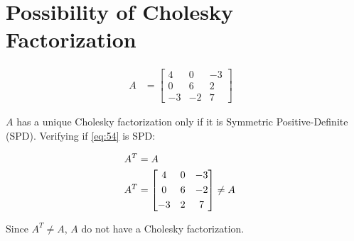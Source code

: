 \section{Possibility of Cholesky Factorization}

	\begin{align}
		A &= \begin{bmatrix}
				4 & 0 & -3 \\[0.3em]
				0 & 6 & 2 \\[0.3em]
				-3 & -2 & 7
			\end{bmatrix}&
	\label{eq:54}
	\end{align}

	$A$ has a unique Cholesky factorization only if it is Symmetric Positive-Definite (SPD). Verifying if \cref{eq:54} is SPD:

	\begin{align}
		A^{T} &= A& \notag \\
		A^{T} &= \begin{bmatrix}
				4 & 0 & -3 \\[0.3em]
				0 & 6 & -2 \\[0.3em]
				-3 & 2 & 7
			\end{bmatrix} \neq A&
	\label{eq:54T}
	\end{align}

	Since $A^{T} \neq A$, $A$ do not have a Cholesky factorization.